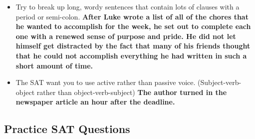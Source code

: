 \begin{itemize}
\item Try to break up long, wordy sentences that contain lots of clauses with a period or semi-colon. \textbf{After Luke wrote a list of all of the chores that he wanted to accomplish for the week, he set out to complete each one with a renewed sense of purpose and pride. He did not let himself get distracted by the fact that many of his friends thought that he could not accomplish everything he had written in such a short amount of time.}

\item The SAT want you to use active rather than passive voice. (Subject-verb-object rather than object-verb-subject) \textbf{The  author turned in the newspaper article an hour after the deadline.}

\end{itemize}

\subsection{Practice SAT Questions}

